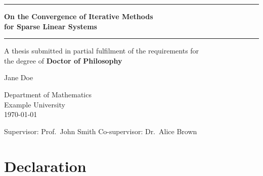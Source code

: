 \documentclass[
    12pt,
    a4paper,
    twoside,           %
    openright          %
]{book}
\begin{document}

\frontmatter

\begin{titlepage}
\centering

\vspace*{2cm}

{\color{thesisblue}\rule{\textwidth}{1pt}}

\vspace{1.5cm}

{\LARGE\bfseries On the Convergence of Iterative Methods\\[0.4em]
for Sparse Linear Systems}

\vspace{1.5cm}

{\color{thesisblue}\rule{\textwidth}{1pt}}

\vspace{2cm}

{\large A thesis submitted in partial fulfilment of the requirements for\\[0.3em]
the degree of \textbf{Doctor of Philosophy}}

\vspace{2cm}

{\Large Jane Doe}

\vspace{1cm}

{\large Department of Mathematics\\[0.2em]
Example University\\[0.2em]
\today}

\vfill

{\small Supervisor: Prof.\ John Smith \quad Co-supervisor: Dr.\ Alice Brown}

\end{titlepage}

\chapter*{Declaration}
\end{document}
